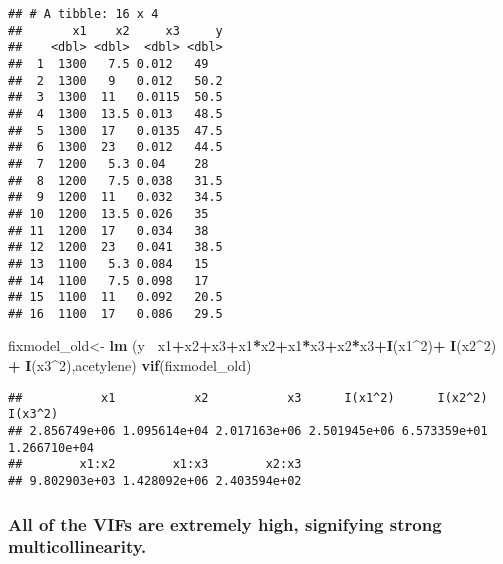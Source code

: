 \documentclass[
]{article}
\newenvironment{Shaded}{\begin{snugshade}}{\end{snugshade}}
\newcommand{\CommentTok}[1]{\textcolor[rgb]{0.56,0.35,0.01}{\textit{#1}}}
\newcommand{\DecValTok}[1]{\textcolor[rgb]{0.00,0.00,0.81}{#1}}
\newcommand{\KeywordTok}[1]{\textcolor[rgb]{0.13,0.29,0.53}{\textbf{#1}}}
\newcommand{\NormalTok}[1]{#1}
\newcommand{\OperatorTok}[1]{\textcolor[rgb]{0.81,0.36,0.00}{\textbf{#1}}}
\newcommand{\StringTok}[1]{\textcolor[rgb]{0.31,0.60,0.02}{#1}}
\begin{document}
\begin{Shaded}
\end{Shaded}

\begin{verbatim}
## # A tibble: 16 x 4
##       x1    x2     x3     y
##    <dbl> <dbl>  <dbl> <dbl>
##  1  1300   7.5 0.012   49  
##  2  1300   9   0.012   50.2
##  3  1300  11   0.0115  50.5
##  4  1300  13.5 0.013   48.5
##  5  1300  17   0.0135  47.5
##  6  1300  23   0.012   44.5
##  7  1200   5.3 0.04    28  
##  8  1200   7.5 0.038   31.5
##  9  1200  11   0.032   34.5
## 10  1200  13.5 0.026   35  
## 11  1200  17   0.034   38  
## 12  1200  23   0.041   38.5
## 13  1100   5.3 0.084   15  
## 14  1100   7.5 0.098   17  
## 15  1100  11   0.092   20.5
## 16  1100  17   0.086   29.5
\end{verbatim}

\begin{Shaded}
\begin{Highlighting}[]
\NormalTok{fixmodel_old<-}\StringTok{ }\KeywordTok{lm}\NormalTok{ (y}\OperatorTok{~}\StringTok{ }\NormalTok{x1}\OperatorTok{+}\NormalTok{x2}\OperatorTok{+}\NormalTok{x3}\OperatorTok{+}\NormalTok{x1}\OperatorTok{*}\NormalTok{x2}\OperatorTok{+}\NormalTok{x1}\OperatorTok{*}\NormalTok{x3}\OperatorTok{+}\NormalTok{x2}\OperatorTok{*}\NormalTok{x3}\OperatorTok{+}\KeywordTok{I}\NormalTok{(x1}\OperatorTok{^}\DecValTok{2}\NormalTok{)}\OperatorTok{+}\StringTok{ }\KeywordTok{I}\NormalTok{(x2}\OperatorTok{^}\DecValTok{2}\NormalTok{) }\OperatorTok{+}\StringTok{ }\KeywordTok{I}\NormalTok{(x3}\OperatorTok{^}\DecValTok{2}\NormalTok{),acetylene)}
\KeywordTok{vif}\NormalTok{(fixmodel_old)}
\end{Highlighting}
\end{Shaded}

\begin{verbatim}
##           x1           x2           x3      I(x1^2)      I(x2^2)      I(x3^2) 
## 2.856749e+06 1.095614e+04 2.017163e+06 2.501945e+06 6.573359e+01 1.266710e+04 
##        x1:x2        x1:x3        x2:x3 
## 9.802903e+03 1.428092e+06 2.403594e+02
\end{verbatim}

\hypertarget{all-of-the-vifs-are-extremely-high-signifying-strong-multicollinearity.}{%
\subsubsection{All of the VIFs are extremely high, signifying strong
multicollinearity.}\label{all-of-the-vifs-are-extremely-high-signifying-strong-multicollinearity.}}
\end{document}
